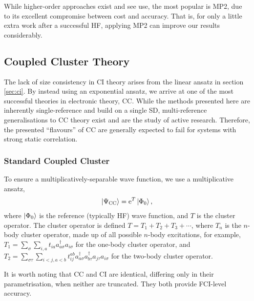 While higher-order approaches exist and see use, the most popular is \gls{MP2}, due to its excellent compromise between cost and accuracy. That is, for only a little extra work after a successful \gls{HF}, applying \gls{MP2} can improve our results considerably.

\subsection{Coupled Cluster Theory}

The lack of size consistency in \gls{CI} theory arises from the linear ansatz in section \ref{sec:ci}. By instead using an exponential ansatz, we arrive at one of the most successful theories in electronic theory, \gls{CC}.\cite{cizekCorrelation1966,cizekCorrelation1971,paldusTimeIndependent1975,shavittManyBody2009} While the methods presented here are inherently single-reference and build on a single \gls{SD}, multi-reference generalisations to \gls{CC} theory exist and are the study of active research.\cite{aotoInternally2016,evangelistaPerspective2018,hanauerPilot2011,jankowskiApplicability1992,jeziorskiCoupledcluster1981,kohnImproved2020} Therefore, the presented ``flavours'' of \gls{CC} are generally expected to fail for systems with strong static correlation.

\subsubsection{Standard Coupled Cluster}

To ensure a multiplicatively-separable wave function, we use a multiplicative ansatz,
\begin{equation}
    \label{eq:cc-ansatz}
\ket{\Psi_\mathrm{CC}} = \mathrm{e}^T\ket{\Phi_0},
\end{equation}
where $\ket{\Phi_0}$ is the reference (typically \gls{HF}) wave function, and $T$ is the cluster operator. The cluster operator is defined $T = T_1 + T_2 + T_3 + \cdots$, where $T_n$ is the $n$-body cluster operator, made up of all possible $n$-body excitations, for example, $T_1 = \sum_\sigma\sum_{i,a}t_{ia}a_{a\sigma}^\dag a_{i\sigma}$ for the one-body cluster operator, and $T_2 = \sum_{\sigma\tau}\sum_{i<j,a<b}t_{ij}^{ab}a_{a\sigma}^\dag a_{b\tau}^\dag a_{j\tau} a_{i\sigma}$ for the two-body cluster operator.

It is worth noting that \gls{CC} and \gls{CI} are identical, differing only in their parametrisation, when neither are truncated. They both provide \gls{FCI}-level accuracy.

